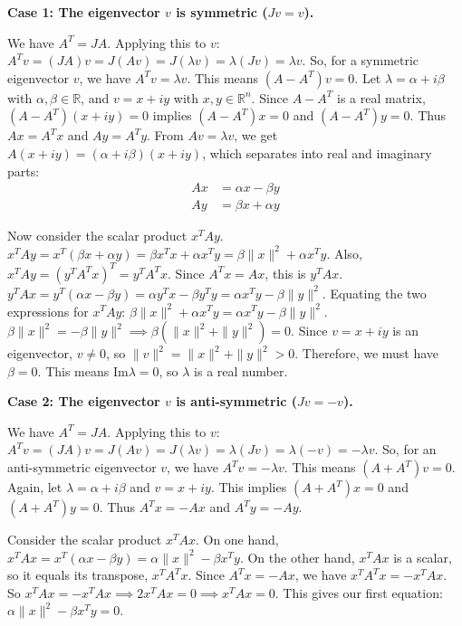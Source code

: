 \documentclass[12pt,a4paper]{article}
\theoremstyle{definition}
\begin{document}
        \textbf{Case 1: The eigenvector $v$ is symmetric ($Jv=v$).}

        We have $A^T = JA$. Applying this to $v$:
        $A^T v = (JA)v = J(Av) = J(\lambda v) = \lambda (Jv) = \lambda v$.
        So, for a symmetric eigenvector $v$, we have $A^T v = \lambda v$.
        This means $(A-A^T)v=0$.
        Let $\lambda = \alpha + i\beta$ with $\alpha, \beta \in \mathbb{R}$, and $v = x+iy$ with $x,y \in \mathbb{R}^n$.
        Since $A-A^T$ is a real matrix, $(A-A^T)(x+iy)=0$ implies $(A-A^T)x=0$ and $(A-A^T)y=0$. Thus $Ax=A^Tx$ and $Ay=A^Ty$.
        From $Av=\lambda v$, we get $A(x+iy) = (\alpha+i\beta)(x+iy)$, which separates into real and imaginary parts:
        \begin{align}
            Ax &= \alpha x - \beta y \\
            Ay &= \beta x + \alpha y
        \end{align}

        Now consider the scalar product $x^T A y$.
        $x^T A y = x^T(\beta x + \alpha y) = \beta x^T x + \alpha x^T y = \beta \|x\|^2 + \alpha x^T y$.
        Also, $x^T A y = (y^T A^T x)^T = y^T A^T x$. Since $A^T x = Ax$, this is $y^T A x$.
        $y^T A x = y^T(\alpha x - \beta y) = \alpha y^T x - \beta y^T y = \alpha x^T y - \beta \|y\|^2$.
        Equating the two expressions for $x^T A y$:
        $\beta \|x\|^2 + \alpha x^T y = \alpha x^T y - \beta \|y\|^2$.
        $\beta \|x\|^2 = -\beta \|y\|^2 \implies \beta (\|x\|^2 + \|y\|^2) = 0$.
        Since $v=x+iy$ is an eigenvector, $v \neq 0$, so $\|v\|^2 = \|x\|^2 + \|y\|^2 > 0$.
        Therefore, we must have $\beta=0$. This means $\text{Im}\lambda=0$, so $\lambda$ is a real number.

        \textbf{Case 2: The eigenvector $v$ is anti-symmetric ($Jv=-v$).}

        We have $A^T = JA$. Applying this to $v$:
        $A^T v = (JA)v = J(Av) = J(\lambda v) = \lambda (Jv) = \lambda (-v) = -\lambda v$.
        So, for an anti-symmetric eigenvector $v$, we have $A^T v = -\lambda v$.
        This means $(A+A^T)v=0$.
        Again, let $\lambda = \alpha + i\beta$ and $v=x+iy$. This implies $(A+A^T)x=0$ and $(A+A^T)y=0$. Thus $A^Tx=-Ax$ and $A^Ty=-Ay$.

        Consider the scalar product $x^T A x$.
        On one hand, $x^T A x = x^T(\alpha x - \beta y) = \alpha\|x\|^2 - \beta x^T y$.
        On the other hand, $x^T A x$ is a scalar, so it equals its transpose, $x^T A^T x$. Since $A^T x = -Ax$, we have $x^T A^T x = -x^T A x$.
        So $x^T A x = -x^T A x \implies 2x^T A x = 0 \implies x^T A x = 0$.
        This gives our first equation: $\alpha\|x\|^2 - \beta x^T y = 0$.
\end{document}
